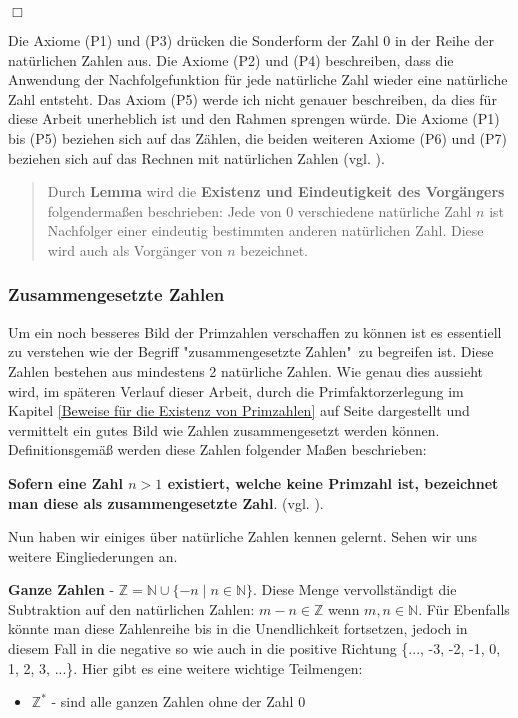 \documentclass[12pt,a4paper]{article}
\theoremstyle{definition}
\begin{document}
\begin{flushright}
$\Box$
\end{flushright}
Die Axiome (P1) und (P3) drücken die Sonderform der Zahl 0 in der Reihe der natürlichen Zahlen aus.
Die Axiome (P2) und (P4) beschreiben, dass die Anwendung der Nachfolgefunktion für jede natürliche Zahl wieder eine natürliche Zahl entsteht.
Das Axiom (P5) werde ich nicht genauer beschreiben, da dies für diese Arbeit unerheblich ist und den Rahmen sprengen würde. %
Die Axiome (P1) bis (P5) beziehen sich auf das Zählen, die beiden weiteren Axiome (P6) und (P7) beziehen sich auf das Rechnen mit natürlichen Zahlen (vgl. \cite[84--85]{Steffen2013}).

\begin{quote}
\small
Durch \textbf{Lemma} %
 wird die \textbf{Existenz und Eindeutigkeit des Vorgängers} folgendermaßen beschrieben:\newline
Jede von 0 verschiedene natürliche Zahl $n$ ist Nachfolger einer eindeutig bestimmten anderen natürlichen Zahl. Diese wird auch als Vorgänger von $n$ bezeichnet.\newline
\autocite[85]{Steffen2013}
\end{quote}

\subsubsection{Zusammengesetzte Zahlen}\label{Zusammengesetzte Zahlen}
Um ein noch besseres Bild der Primzahlen verschaffen zu können ist es essentiell zu verstehen wie der Begriff "{zusammengesetzte Zahlen}"\ zu begreifen ist.
Diese Zahlen bestehen aus mindestens 2 natürliche Zahlen.
Wie genau dies aussieht wird, im späteren Verlauf dieser Arbeit, durch die Primfaktorzerlegung im Kapitel \ref{Beweise für die Existenz von Primzahlen} auf Seite \pageref{Primfaktorzerlegung} dargestellt und vermittelt ein gutes Bild wie Zahlen zusammengesetzt werden können.
Definitionsgemäß werden diese Zahlen folgender Maßen beschrieben:

\textbf{Sofern eine Zahl $n > 1$ existiert, welche keine Primzahl ist, bezeichnet man diese als zusammengesetzte Zahl}.
(vgl. \cite[13]{RempeGillen2009}).

Nun haben wir einiges über natürliche Zahlen kennen gelernt. Sehen wir uns weitere Eingliederungen an.

\textbf{Ganze Zahlen} - $\mathbb{Z} = \mathbb{N} \cup \{-n \mid n \in \mathbb{N}\}$.\newline
Diese Menge vervollständigt die Subtraktion auf den natürlichen Zahlen: $m - n \in \mathbb{Z}$ wenn $m, n \in \mathbb{N}$. 
Für 
Ebenfalls könnte man diese Zahlenreihe bis in die Unendlichkeit fortsetzen, jedoch in diesem Fall in die negative so wie auch in die positive Richtung \{..., -3, -2, -1, 0, 1, 2, 3, ...\}.
Hier gibt es eine weitere wichtige Teilmengen: %
\begin{itemize}
\item $\mathbb{Z}^*$ - sind alle ganzen Zahlen ohne der Zahl 0
\end{itemize}
\end{document}
